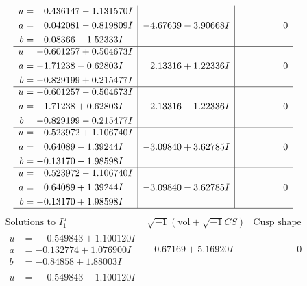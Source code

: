 \documentclass[1p]{elsarticle_modified}
\theoremstyle{definition}
\newcommand{\I}{\sqrt{-1}}
\begin{document}
$$\begin{array}{c|c|c}
\begin{aligned}
u &= \phantom{-}0.436147 - 1.131570 I \\
a &= \phantom{-}0.042081 - 0.819809 I \\
b &= -0.08366 - 1.52333 I\end{aligned}
 & -4.67639 - 3.90668 I & \phantom{-0.000000 } 0 \\ \hline\begin{aligned}
u &= -0.601257 + 0.504673 I \\
a &= -1.71238 - 0.62803 I \\
b &= -0.829199 + 0.215477 I\end{aligned}
 & \phantom{-}2.13316 + 1.22336 I & \phantom{-0.000000 } 0 \\ \hline\begin{aligned}
u &= -0.601257 - 0.504673 I \\
a &= -1.71238 + 0.62803 I \\
b &= -0.829199 - 0.215477 I\end{aligned}
 & \phantom{-}2.13316 - 1.22336 I & \phantom{-0.000000 } 0 \\ \hline\begin{aligned}
u &= \phantom{-}0.523972 + 1.106740 I \\
a &= \phantom{-}0.64089 - 1.39244 I \\
b &= -0.13170 - 1.98598 I\end{aligned}
 & -3.09840 + 3.62785 I & \phantom{-0.000000 } 0 \\ \hline\begin{aligned}
u &= \phantom{-}0.523972 - 1.106740 I \\
a &= \phantom{-}0.64089 + 1.39244 I \\
b &= -0.13170 + 1.98598 I\end{aligned}
 & -3.09840 - 3.62785 I & \phantom{-0.000000 } 0\\
 \hline 
 \end{array}$$\newpage$$\begin{array}{c|c|c}  
\text{Solutions to }I^u_{1}& \I (\text{vol} + \sqrt{-1}CS) & \text{Cusp shape}\\
 \hline 
\begin{aligned}
u &= \phantom{-}0.549843 + 1.100120 I \\
a &= -0.132774 + 1.076900 I \\
b &= -0.84858 + 1.88003 I\end{aligned}
 & -0.67169 + 5.16920 I & \phantom{-0.000000 } 0 \\ \hline\begin{aligned}
u &= \phantom{-}0.549843 - 1.100120 I \\

\end{aligned}
\end{array}$$
\end{document}
